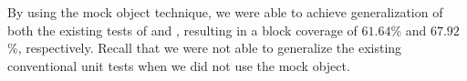 By using the mock object technique, we were able to achieve generalization of both the existing tests of  and , resulting in a block coverage of $61.64$\% and $67.92$\%, respectively. Recall that we were not able to generalize the existing conventional unit tests when we did not use the mock object. 

%
%
